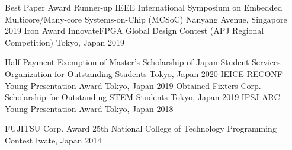 

\begin{cvhonors}
  \cvhonor
    {Best Paper Award Runner-up} %
    {IEEE International Symposium on Embedded Multicore/Many-core Systems-on-Chip (MCSoC)} %
    {Nanyang Avenue, Singapore} %
    {2019} %
  \cvhonor
    {Iron Award} %
    {InnovateFPGA Global Design Contest (APJ Regional Competition)} %
    {Tokyo, Japan} %
    {2019} %
\end{cvhonors}


\begin{cvhonors}
  \cvact
    {Half Payment Exemption of Master's Scholarship of Japan Student Services Organization for Outstanding Students} %
    {} 
    {Tokyo, Japan} %
    {2020} %
  \cvact
    {IEICE RECONF Young Presentation Award} %
    {} %
    {Tokyo, Japan} %
    {2019} %
  \cvact
    {Obtained Fixters Corp. Scholarship for Outstanding STEM Students} %
    {} 
    {Tokyo, Japan} %
    {2019} %
  \cvact
    {IPSJ ARC Young Presentation Award} %
    {} %
    {Tokyo, Japan} %
    {2018} %

  \cvhonor
    {FUJITSU Corp. Award} %
    {25th National College of Technology Programming Contest } %
    {Iwate, Japan} %
    {2014} %
    

\end{cvhonors}
